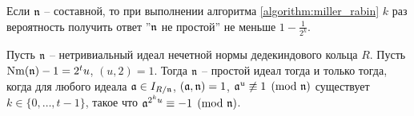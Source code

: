 \documentclass[_00_dissertation.tex]{subfiles}
\begin{document}
\begin{remark}
    Если $\mathfrak{n}$ -- составной, то при выполнении алгоритма \ref{algorithm:miller_rabin} $k$ раз вероятность получить ответ ''$\mathfrak{n}$ не простой'' не меньше $1 - \frac{1}{2^k}$.
\end{remark}

\begin{theorem}\label{theorem:miller_criteria}
    Пусть $\mathfrak{n}$ -- нетривиальный идеал нечетной нормы дедекиндового кольца $R$.
    Пусть $\textrm{Nm}(\mathfrak{n}) - 1 = 2^t u$, $(u, 2) = 1$.
    Тогда $\mathfrak{n}$ -- простой идеал тогда и только тогда, когда для любого идеала $\mathfrak{a} \in I_{R/\mathfrak{n}}$, $(\mathfrak{a}, \mathfrak{n}) = 1$, $\mathfrak{a}^u \not\equiv 1 \pmod{\mathfrak{n}}$ существует $k\in \{0, \dots, t-1\}$, такое что $\mathfrak{a}^{2^{k}u} \equiv -1 \pmod{\mathfrak{n}}$.
\end{theorem}
\end{document}
